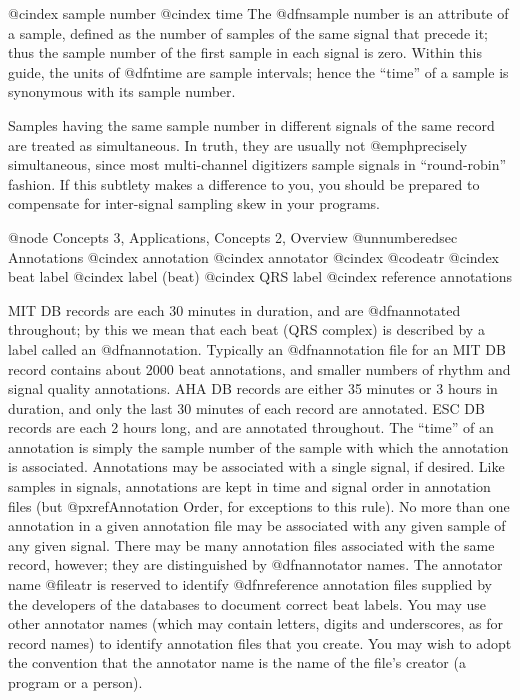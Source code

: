 @cindex sample number
@cindex time
The @dfn{sample number} is an attribute of a sample, defined as the
number of samples of the same signal that precede it;  thus the sample
number of the first sample in each signal is zero.  Within this guide,
the units of @dfn{time} are sample intervals;  hence the ``time'' of a
sample is synonymous with its sample number.

Samples having the same sample number in different signals of the same
record are treated as simultaneous.  In truth, they are usually not
@emph{precisely} simultaneous, since most multi-channel digitizers
sample signals in ``round-robin'' fashion.  If this subtlety makes a
difference to you, you should be prepared to compensate for inter-signal
sampling skew in your programs.

@node     Concepts 3, Applications, Concepts 2, Overview
@unnumberedsec Annotations
@cindex annotation
@cindex annotator
@cindex @code{atr}
@cindex beat label
@cindex label (beat)
@cindex QRS label
@cindex reference annotations

MIT DB records are each 30 minutes in duration, and are @dfn{annotated}
throughout; by this we mean that each beat (QRS complex) is described by
a label called an @dfn{annotation}.  Typically an @dfn{annotation file}
for an MIT DB record contains about 2000 beat annotations, and smaller
numbers of rhythm and signal quality annotations.  AHA DB records are
either 35 minutes or 3 hours in duration, and only the last 30 minutes
of each record are annotated.  ESC DB records are each 2 hours long, and
are annotated throughout.  The ``time'' of an annotation is simply the
sample number of the sample with which the annotation is associated.
Annotations may be associated with a single signal, if desired.  Like
samples in signals, annotations are kept in time and signal order in
annotation files (but @pxref{Annotation Order}, for exceptions to this
rule).  No more than one annotation in a given annotation file may be
associated with any given sample of any given signal.  There may be many
annotation files associated with the same record, however; they are
distinguished by @dfn{annotator names}.  The annotator name @file{atr}
is reserved to identify @dfn{reference annotation files} supplied by the
developers of the databases to document correct beat labels.  You may
use other annotator names (which may contain letters, digits and
underscores, as for record names) to identify annotation files that you
create.  You may wish to adopt the convention that the annotator name is
the name of the file's creator (a program or a person).

